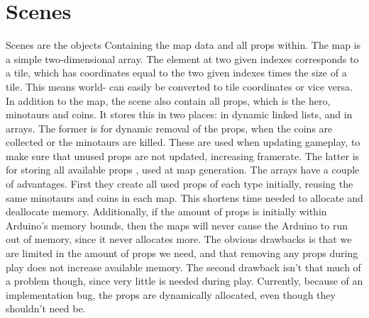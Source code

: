 \section{Scenes} %
Scenes are the objects Containing the map data and all props within. The map is a simple two-dimensional array. The element at two given indexes corresponds to a tile, which has coordinates equal to the two given indexes times the size of a tile. This means world- can easily be converted to tile coordinates or vice versa.
\newline
In addition to the map, the scene also contain all props, which is the hero, minotaurs and coins. It stores this in two places: in dynamic linked lists, and in arrays. The former is for dynamic removal of the props, when the coins are collected or the minotaurs are killed. These are used when updating gameplay, to make sure that unused props are not updated, increasing framerate. The latter is for storing all available props , used at map generation. The arrays have a couple of advantages. First they create all used props of each type initially, reusing the same minotaurs and coins in each map. This shortens time needed to allocate and deallocate memory. Additionally, if the amount of props is initially within Arduino's memory bounds, then the maps will never cause the Arduino to run out of memory, since it never allocates more. The obvious drawbacks is that we are limited in the amount of props we need, and that removing any props during play does not increase available memory. The second drawback isn't that much of a problem though, since very little is needed during play.
\newline
Currently, because of an implementation bug, the props are dynamically allocated, even though they shouldn't need be.

